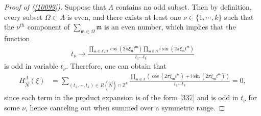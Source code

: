 \documentclass[11 pt,letterpaper]{amsart}
\theoremstyle{plain}
\theoremstyle{definition}
\theoremstyle{remark} \theoremstyle{exam} \theoremstyle{ob}
\numberwithin{equation}{section}
\begin{document}
\begin{proof}[Proof of (\ref{10099})]
	
	Suppose  that $\Lambda$ contains no odd subset. Then by definition, every subset $\Omega\subset \Lambda$ is even, and  there exists at least one $\nu\in \{1,\cdots,k\}$ such that the $\nu^{th}$ component of $  \sum_{\mathfrak{m}\in \Omega} \mathfrak{m}  $ is an even number, which implies that the function
	\begin{align}\label{337}
		t_{\nu}\rightarrow\frac{ \prod_{\mathfrak{m}\in \Lambda\setminus\Omega} \cos(2\pi \xi_{\mathfrak m} t^{\mathfrak{m}}) \prod_{\mathfrak{m}\in \Omega}  i\sin(2\pi \xi_{\mathfrak m} t^{\mathfrak{m}})   }{t_1\cdots t_k}
	\end{align}
	is  odd in variable $t_\nu$.
	Therefore, one can obtain that
	\begin{align*}
		H^{\Lambda}_{\vec{N}}(\xi)
		&=\sum_{(t_1,\cdots,t_k)\in R(\vec{N})\cap   \mathbb{Z}^k} \frac{\prod_{\mathfrak{m}\in \Lambda} \left(\cos (2\pi   \xi_{\mathfrak m}t^{\mathfrak{m}})+i\sin (2\pi \xi_{\mathfrak m}t^{\mathfrak{m}} ) \right) }{t_1\cdots t_k}=0,
	\end{align*}
	since each term in the product expansion is of the form \eqref{337} and is odd in $t_\nu$ for some $\nu$, hence canceling out when summed over a symmetric range.
\end{proof}
\end{document}
